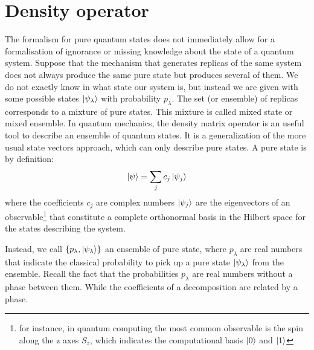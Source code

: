 





\section{Density operator}
The formalism for pure quantum states does not immediately allow for a formalisation of ignorance or missing knowledge about the state of a quantum system.
Suppose that the mechanism that generates replicas of the same system does not always produce the same pure state but produces several of them. We do not exactly know in what state our system is, but instead we are given with some possible states $\ket{\psi_{\lambda}}$ with probability $p_{\lambda}$. The set (or ensemble) of replicas corresponds to a mixture of pure states. This mixture is called mixed state or mixed ensemble. 
In quantum mechanics, the density matrix operator is an useful tool to describe an ensemble of quantum states. It is a generalization of the more usual state vectors approach, which can only describe pure states. 
A pure state is by definition:
\begin{equation}
    \ket{\psi} = \sum_j c_j \ket{\psi_j}
\end{equation}
where the coefficients $c_j$ are complex numbers $\ket{\psi_j}$ are the eigenvectors of an observable\footnote{for instance, in quantum computing the most common observable is the spin along the z axes $S_z$, which indicates the computational basis $\ket{0}$ and $\ket{1}$} that constitute a complete orthonormal basis in the Hilbert space for the states describing the system.




Instead, we call $\{p_{\lambda}, \ket{\psi_{\lambda}} \}$ an ensemble of pure state, where $p_{\lambda}$ are real numbers that indicate the classical probability to pick up a pure state $\ket{\psi_{\lambda}}$ from the ensemble. Recall the fact that the probabilities $p_{\lambda}$ are real numbers without a phase between them. While the coefficients of a decomposition are related by a phase. 

